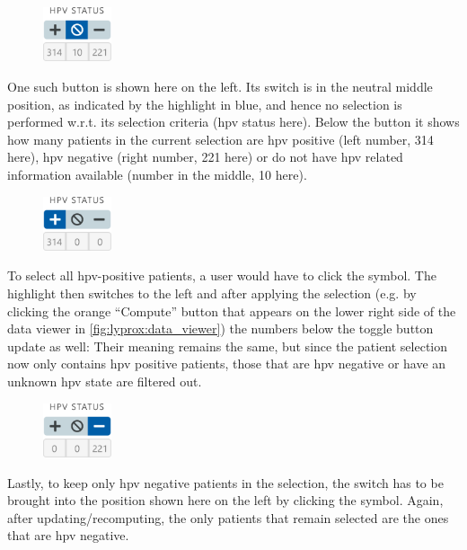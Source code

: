 \documentclass[\relativeRoot/main.tex]{subfiles}
\begin{document}
\begin{samepage}
    \setlength\intextsep{0pt}
    \begin{figure}
        \includegraphics[width=0.18\textwidth]{figures/hpv_neutral.png}
    \end{figure}
    One such button is shown here on the left. Its switch is in the neutral middle  position, as indicated by the highlight in blue, and hence no selection is performed w.r.t. its selection criteria (\gls{hpv} status here). Below the button it shows how many patients in the current selection are \gls{hpv} positive (left number, 314 here), \gls{hpv} negative (right number, 221 here) or do not have \gls{hpv} related information available (number in the middle, 10 here).

    \begin{figure}
        \includegraphics[width=0.18\textwidth]{figures/hpv_positive.png}
    \end{figure}
    To select all \gls{hpv}-positive patients, a user would have to click the  symbol. The highlight then switches to the left and after applying the selection (e.g. by clicking the orange ``Compute'' button that appears on the lower right side of the data viewer in \cref{fig:lyprox:data_viewer}) the numbers below the toggle button update as well: Their meaning remains the same, but since the patient selection now only contains \gls{hpv} positive patients, those that are \gls{hpv} negative or have an unknown \gls{hpv} state are filtered out.

    \begin{figure}
        \includegraphics[width=0.18\textwidth]{figures/hpv_negative.png}
    \end{figure}
    Lastly, to keep only \gls{hpv} negative patients in the selection, the switch has to be brought into the position shown here on the left by clicking the  symbol. Again, after updating/recomputing, the only patients that remain selected are the ones that are \gls{hpv} negative.

    
\end{samepage}
\end{document}
